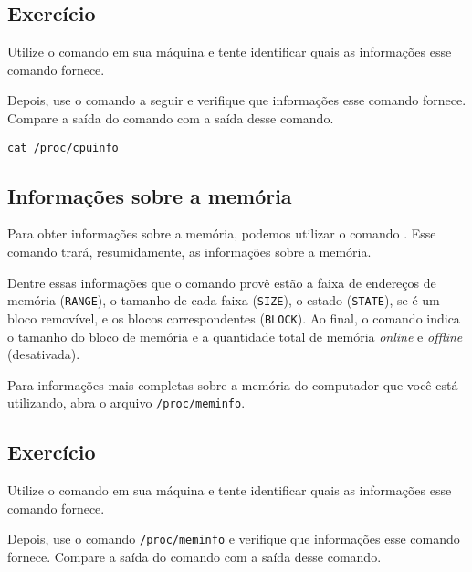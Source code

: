 \subsection{Exercício}
Utilize o comando  em sua máquina e tente identificar quais as informações esse comando fornece.

Depois, use o comando a seguir e verifique que informações esse comando fornece. Compare a saída do comando  com a saída desse comando.

\begin{lstlisting}[style=MyBashStyle]
cat /proc/cpuinfo
\end{lstlisting}


\subsection{Informações sobre a memória}
Para obter informações sobre a memória, podemos utilizar o comando . Esse comando trará, resumidamente, as informações sobre a memória. 

Dentre essas informações que o comando  provê estão a faixa de endereços de memória (\texttt{RANGE}), o tamanho de cada faixa (\texttt{SIZE}), o estado (\texttt{STATE}), se é um bloco removível, e os blocos correspondentes (\texttt{BLOCK}). Ao final, o comando indica o tamanho do bloco de memória e a quantidade total de memória \textit{online} e \textit{offline} (desativada).

Para informações mais completas sobre a memória do computador que você está utilizando, abra o arquivo \texttt{/proc/meminfo}.

\subsection{Exercício}
Utilize o comando  em sua máquina e tente identificar quais as informações esse comando fornece.

Depois, use o comando  \texttt{/proc/meminfo} e verifique que informações esse comando fornece. Compare a saída do comando  com a saída desse comando.
